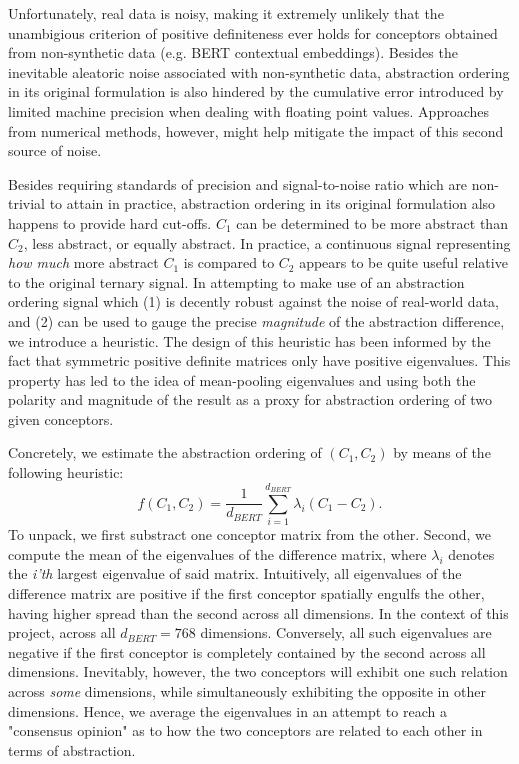 Unfortunately, real data is noisy, making it extremely unlikely that the unambigious criterion of positive definiteness ever holds for conceptors obtained from non-synthetic data (e.g. BERT contextual embeddings). Besides the inevitable aleatoric noise associated with non-synthetic data, abstraction ordering in its original formulation is also hindered by the cumulative error introduced by limited machine precision when dealing with floating point values. Approaches from numerical methods, however, might help mitigate the impact of this second source of noise.

Besides requiring standards of precision and signal-to-noise ratio which are non-trivial to attain in practice, abstraction ordering in its original formulation also happens to provide hard cut-offs. $C_1$ can be determined to be more abstract than $C_2$, less abstract, or equally abstract. In practice, a continuous signal representing \textit{how much} more abstract $C_1$ is compared to $C_2$ appears to be quite useful relative to the original ternary signal. In attempting to make use of an abstraction ordering signal which (1) is decently robust against the noise of real-world data, and (2) can be used to gauge the precise \textit{magnitude} of the abstraction difference, we introduce a heuristic. The design of this heuristic has been informed by the fact that symmetric positive definite matrices only have positive eigenvalues. This property has led to the idea of mean-pooling eigenvalues and using both the polarity and magnitude of the result as a proxy for abstraction ordering of two given conceptors.

Concretely, we estimate the abstraction ordering of $(C_1, C_2)$ by means of the following heuristic:$$f(C_1, C_2) = \frac{1}{d_{BERT}} \sum\limits_{i=1}^{d_{BERT}} \lambda_i(C_1 - C_2).$$ To unpack, we first substract one conceptor matrix from the other. Second, we compute the mean of the eigenvalues of the difference matrix, where $\lambda_i$ denotes the \textit{i'th} largest eigenvalue of said matrix. Intuitively, all eigenvalues of the difference matrix are positive if the first conceptor spatially engulfs the other, having higher spread than the second across all dimensions. In the context of this project, across all $d_{BERT} = 768$ dimensions. Conversely, all such eigenvalues are negative if the first conceptor is completely contained by the second across all dimensions. Inevitably, however, the two conceptors will exhibit one such relation across \textit{some} dimensions, while simultaneously exhibiting the opposite in other dimensions. Hence, we average the eigenvalues in an attempt to reach a "consensus opinion" as to how the two conceptors are related to each other in terms of abstraction.


